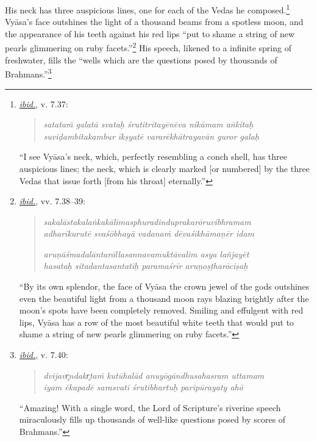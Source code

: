  His neck has three auspicious lines, one for each of the Vedas he composed.\footnote{%
\hyperref[NarayanaPandita2017]{\emph{ibid.}}, v. 7.37:\setlength{\parindent}{2em}

\vspace{-1.5ex}\begin{quote}\raggedright
      \emph{satataṁ galatā svataḥ śrutitritayēnēva nikāmam aṅkitaḥ}\\
\emph{suviḍambitakambur īkṣyatē vararēkhātrayavān guror galaḥ}\end{quote}\vspace{-1.5ex}
      

\noindent{}“I see Vyāsa’s neck, which, perfectly resembling a conch shell, has three auspicious lines; the neck, which is clearly marked [or numbered] by the three Vedas that issue forth [from his throat] eternally.”
}
 Vyāsa’s face outshines the light of a thousand beams from a spotless moon, and the appearance of his teeth against his red lips “put to shame a string of new pearls glimmering on ruby facets.”\footnote{%
\hyperref[NarayanaPandita2017]{\emph{ibid.}}, vv. 7.38–39:\setlength{\parindent}{2em}

\vspace{-1.5ex}\begin{quote}\raggedright
      \emph{sakalāstakalaṅkakālimasphuradinduprakarōruvibhramam}\\
\emph{adharīkurutē svaśōbhayā vadanaṁ dēvaśikhāmaṇēr idam}

\emph{aruṇāśmadalāntarōllasannavamuktāvalim asya lañjayēt}\\
\emph{hasataḥ sitadantasantatiḥ paramaśrīr aruṇoṣṭharōciṣaḥ}\end{quote}\vspace{-1.5ex}
      

\noindent{}“By its own splendor, the face of Vyāsa  \Dash  the crown jewel of the gods  \Dash  outshines even the beautiful light from a thousand moon rays blazing brightly after the moon’s spots have been completely removed. Smiling and effulgent with red lips, Vyāsa has a row of the most beautiful white teeth that would put to shame a string of new pearls glimmering on ruby facets.”
}
 His speech, likened to a infinite spring of freshwater, fills the “wells which are the questions posed by thousands of Brahmans.”\footnote{%
\hyperref[NarayanaPandita2017]{\emph{ibid.}}, v. 7.40:\setlength{\parindent}{2em}

\vspace{-1.5ex}\begin{quote}\raggedright
      \emph{dvijavr̥ndakr̥taṁ kutūhalād anuyōgāndhusahasram uttamam}\\
\emph{iyam ēkapadē sarasvatī śrutibhartuḥ paripūrayaty ahō}\end{quote}\vspace{-1.5ex}
      

\noindent{}“Amazing! With a single word, the Lord of Scripture’s riverine speech miraculously fills up thousands of well-like questions posed by scores of Brahmans.”
}
